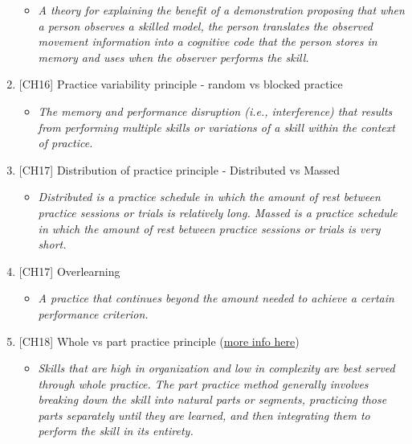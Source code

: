 \documentclass[
  letterpaper,
  DIV=11,
  numbers=noendperiod]{scrartcl}
\providecommand{\tightlist}{%
  \setlength{\itemsep}{0pt}\setlength{\parskip}{0pt}}\usepackage{longtable,booktabs,array}
\begin{document}
\begin{enumerate}
  \begin{itemize}
  \tightlist
  \item
    \emph{A theory for explaining the benefit of a demonstration
    proposing that when a person observes a skilled model, the person
    translates the observed movement information into a cognitive code
    that the person stores in memory and uses when the observer performs
    the skill.}
  \end{itemize}
\item
  {[}CH16{]} Practice variability principle - random vs blocked practice

  \begin{itemize}
  \tightlist
  \item
    \emph{The memory and performance disruption (i.e., interference)
    that results from performing multiple skills or variations of a
    skill within the context of practice.}
  \end{itemize}
\item
  {[}CH17{]} Distribution of practice principle - Distributed vs Massed

  \begin{itemize}
  \tightlist
  \item
    \emph{Distributed is a practice schedule in which the amount of rest
    between practice sessions or trials is relatively long. Massed is a
    practice schedule in which the amount of rest between practice
    sessions or trials is very short.}
  \end{itemize}
\item
  {[}CH17{]} Overlearning

  \begin{itemize}
  \tightlist
  \item
    \emph{A practice that continues beyond the amount needed to achieve
    a certain performance criterion.}
  \end{itemize}
\item
  {[}CH18{]} Whole vs part practice principle
  (\href{http://bit.ly/2IHAavV}{more info here})

  \begin{itemize}
  \tightlist
  \item
    \emph{Skills that are high in organization and low in complexity are
    best served through whole practice. The part practice method
    generally involves breaking down the skill into natural parts or
    segments, practicing those parts separately until they are learned,
    and then integrating them to perform the skill in its entirety.}
  \end{itemize}
\end{enumerate}
\end{document}
